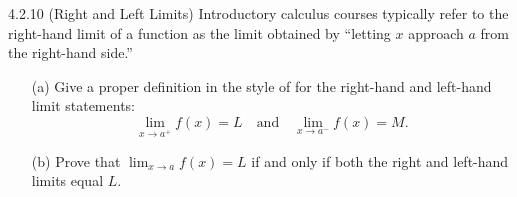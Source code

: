 \vspace*{-0.5cm}

\begin{exercise}
    {4.2.10 (Right and Left Limits)} Introductory calculus courses typically refer to the right-hand limit of a function as the limit obtained by “letting \(x\) approach \(a\) from the right-hand side.”
    \begin{enumerate}
        \item[(a)] Give a proper definition in the style of  for the right-hand and left-hand limit statements:
              \[
                  \lim_{x \to a^+} f(x) = L \quad \text{and} \quad \lim_{x \to a^-} f(x) = M.
              \]

        \item[(b)] Prove that \(\lim_{x \to a} f(x) = L\) if and only if both the right and left-hand limits equal \(L\).
    \end{enumerate}
\end{exercise}


